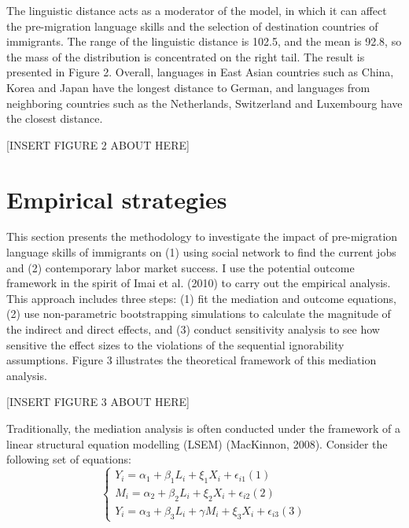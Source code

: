 \documentclass[12pt,a4paper]{article}
\begin{document}
The linguistic distance acts as a moderator of the model, in which it can affect the pre-migration language skills and the selection of destination countries of immigrants. The range of the linguistic distance is 102.5, and the mean is 92.8, so the mass of the distribution is concentrated on the right tail. The result is presented in Figure 2. Overall, languages in East Asian countries such as China, Korea and Japan have the longest distance to German, and languages from neighboring countries such as the Netherlands, Switzerland and Luxembourg have the closest distance.

\begin{center}
[INSERT FIGURE 2 ABOUT HERE]
\end{center}


\section{Empirical strategies}

This section presents the methodology to investigate the impact of pre-migration language skills of immigrants on (1) using social network to find the current jobs and (2) contemporary labor market success. I use the potential outcome framework in the spirit of Imai et al. (2010) to carry out the empirical analysis. This approach includes three steps: (1) fit the mediation and outcome equations, (2) use non-parametric bootstrapping simulations to calculate the magnitude of the indirect and direct effects, and (3) conduct sensitivity analysis to see how sensitive the effect sizes to the violations of the sequential ignorability assumptions. Figure 3 illustrates the theoretical framework of this mediation analysis.

\begin{center}
[INSERT FIGURE 3 ABOUT HERE]
\end{center}

Traditionally, the mediation analysis is often conducted under the framework of a linear structural equation modelling (LSEM) (MacKinnon, 2008). Consider the following set of equations:
$$
\begin{cases} Y_{i} = \alpha_{1} + \beta_{1}L_{i} + \xi_{1}X_{i} + \epsilon_{i1} (1) \\ M_{i} = \alpha_{2} + \beta_{2}L_{i} + \xi_{2}X_{i} + \epsilon_{i2} (2) \\ Y_{i} = \alpha_{3} + \beta_{3}L_{i} + \gamma M_{i} + \xi_{3}X_{i} + \epsilon_{i3} (3)
\end{cases}
$$
\end{document}
